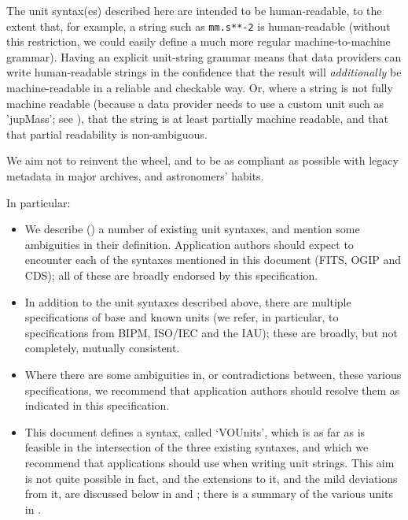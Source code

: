 \documentclass[11pt,notitlepage,onecolumn]{ivoa}
\newcommand{\unit}[1]{\texttt{\small\color{orange}#1}}
\begin{document}
The unit syntax(es) described here are intended to be human-readable,
to the extent that, for example, a string such as \unit{mm.s**-2} is
human-readable (without this restriction, we could easily define a
much more regular machine-to-machine grammar).  Having an explicit
unit-string grammar means that data providers can write human-readable
strings in the confidence that the result will \emph{additionally} be
machine-readable in a reliable and checkable way.  Or, where a string
is not fully machine readable (because a data provider needs to use a
custom unit such as 'jupMass'; see ), that the
string is at least partially machine readable, and that that partial
readability is non-ambiguous.

We aim not to reinvent the wheel, and to be as compliant as possible with
legacy metadata in major archives, and astronomers' habits.

In particular:
\begin{itemize}
\item We describe () a number of existing unit
  syntaxes, and mention some ambiguities in their
  definition. Application authors should expect to encounter each of
  the syntaxes mentioned in this document (FITS, OGIP and CDS); all of
  these are broadly endorsed by this specification.
\item In addition to the unit syntaxes described above, there are
  multiple specifications of base and known units
  (we refer, in particular, to 
  specifications from BIPM, ISO/IEC and the IAU);
  these are broadly, but not completely, mutually consistent.
\item Where there are some ambiguities in, or contradictions between,
  these various specifications, we recommend that application authors should
  resolve them as indicated in this specification.  
\item This document defines a syntax, called `VOUnits', which is as
  far as is feasible in the intersection of the three existing
  syntaxes, and which we recommend that applications should use when
  writing unit strings.  This aim is not quite possible in fact, and
  the extensions to it, and the mild deviations from it, are discussed
  below in  and ;
  there is a summary of the various units
  in .
\end{itemize}

\end{document}
